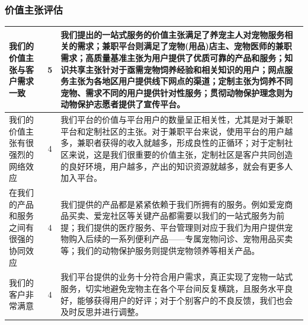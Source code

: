 \documentclass[a4paper]{ctexart}
\begin{document}
\subsubsection{价值主张评估}
\begin{table}[h]
  \centering
\begin{tabular}{|p{3.5cm}|c|p{10cm}|}
  \hline
  我们的价值主张与客户需求一致 & 5 & 我们提出的一站式服务的价值主张满足了养宠主人对宠物服务相关的需求；兼职平台则满足了宠物(用品)店主、宠物医师的兼职需求；高质量基准主张为用户提供了优质可靠的产品和服务；知识共享主张针对于亟需宠物饲养经验和相关知识的用户；网点服务主张为各地区用户提供线下网点的渠道；定制主张为饲养不同宠物、需求不同的用户提供针对性服务；贯彻动物保护理念则为动物保护志愿者提供了宣传平台。\\
  \hline
  我们的价值主张有很强烈的网络效应  & 4 & 我们平台的价值与平台用户的数量呈正相关性，尤其是对于兼职平台和定制社区的主张。对于兼职平台来说，使用平台的用户越多，兼职者获得的收入就越多，形成良性的正循环；对于定制社区来说，这是我们很重要的价值主张，定制社区是客户共同创造的良好环境，用户越多，产出的知识资源就越多，就会有更多人加入平台。\\
  \hline
  在我们的产品和服务之间有很强的协同效应 & 4 & 我们提供的产品都是紧紧依赖于我们所拥有的服务。例如爱宠商品买卖、爱宠社区等关键产品都需要以我们的一站式服务为前提；我们提供的医疗服务、平台管理则对应于我们为用户提供宠物购入后续的一系列便利产品——专属宠物问诊、宠物用品买卖等；我们的动物保护服务则提供宠物领养等相关产品。\\
  \hline
  我们的客户非常满意 & 4 & 我们平台提供的业务十分符合用户需求，真正实现了宠物一站式服务，切实地避免宠物主在各个平台间反复横跳，且服务水平良好，能够获得用户的好评；对于个别客户的不良反馈，我们也会及时反思并进行调整。\\
  \hline
\end{tabular}
\end{table}
\FloatBarrier
\end{document}
